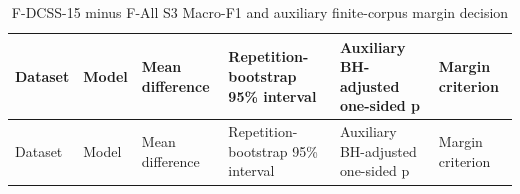 \documentclass[
  10pt,
]{article}
\begin{document}
\begin{longtable}[]{@{}
  >{\raggedright\arraybackslash}p{}
  >{\raggedright\arraybackslash}p{}
  >{\raggedleft\arraybackslash}p{}
  >{\raggedleft\arraybackslash}p{}
  >{\raggedleft\arraybackslash}p{}
  >{\raggedright\arraybackslash}p{}@{}}
\caption{F-DCSS-15 minus F-All S3 Macro-F1 and auxiliary finite-corpus
margin decision}\tabularnewline
\toprule\noalign{}
\begin{minipage}[b]{\linewidth}\raggedright
Dataset
\end{minipage} & \begin{minipage}[b]{\linewidth}\raggedright
Model
\end{minipage} & \begin{minipage}[b]{\linewidth}\raggedleft
Mean difference
\end{minipage} & \begin{minipage}[b]{\linewidth}\raggedleft
Repetition-bootstrap 95\% interval
\end{minipage} & \begin{minipage}[b]{\linewidth}\raggedleft
Auxiliary BH-adjusted one-sided p
\end{minipage} & \begin{minipage}[b]{\linewidth}\raggedright
Margin criterion
\end{minipage} \\
\midrule\noalign{}
\endfirsthead
\toprule\noalign{}
\begin{minipage}[b]{\linewidth}\raggedright
Dataset
\end{minipage} & \begin{minipage}[b]{\linewidth}\raggedright
Model
\end{minipage} & \begin{minipage}[b]{\linewidth}\raggedleft
Mean difference
\end{minipage} & \begin{minipage}[b]{\linewidth}\raggedleft
Repetition-bootstrap 95\% interval
\end{minipage} & \begin{minipage}[b]{\linewidth}\raggedleft
Auxiliary BH-adjusted one-sided p
\end{minipage} & \begin{minipage}[b]{\linewidth}\raggedright
Margin criterion

\end{minipage}
\end{longtable}
\end{document}
